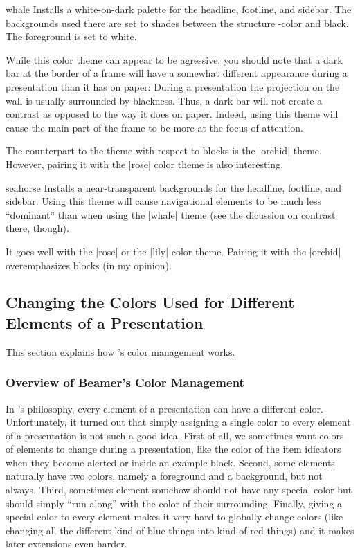 \begin{colorthemeexample}{whale}
  Installs a white-on-dark palette for the headline, footline, and
  sidebar. The backgrounds used there are set to shades between the
  structure \beamer-color and black. The foreground is set to
  white.

  While this color theme can appear to be agressive, you should note
  that a dark bar at the border of a frame will have a somewhat
  different appearance during a presentation than it has on paper:
  During a presentation the projection on the 
  wall is usually surrounded by blackness. Thus, a dark bar will
  not create a contrast as opposed to the way it does on
  paper. Indeed, using this theme will cause the main part of the
  frame to be more at the focus of attention.

  The counterpart to the theme with respect to blocks is the |orchid|
  theme. However, pairing it with the |rose| color theme is also
  interesting. 
\end{colorthemeexample}

\begin{colorthemeexample}{seahorse}
  Installs a near-transparent backgrounds for the headline, footline,
  and sidebar. Using this theme will cause navigational elements to be
  much less ``dominant'' than when using the |whale| theme (see the
  dicussion on contrast there, though).

  It goes well with the |rose| or the |lily| color theme. Pairing it
  with the |orchid| overemphasizes blocks (in my opinion).
\end{colorthemeexample}




\subsection{Changing the Colors Used for Different Elements of a Presentation}

This section explains how \beamer's color management works.



\subsubsection{Overview of Beamer's Color Management}

In \beamer's philosophy, every element of a presentation can have a
different color. Unfortunately, it turned out that simply assigning a
single color to every element of a presentation is not such a good
idea. First of all, we sometimes  want colors of elements to change
during a presentation, like the color of the item idicators when they
become alerted or inside an example block. Second, some elements
naturally have two colors, namely a foreground and a background, but
not always. Third, sometimes element somehow should not have any
special color but should simply ``run along'' with the color of their
surrounding. Finally, giving a special color to every element makes it
very hard to globally change colors (like changing all the different
kind-of-blue things into kind-of-red things) and it makes later
extensions even harder.

